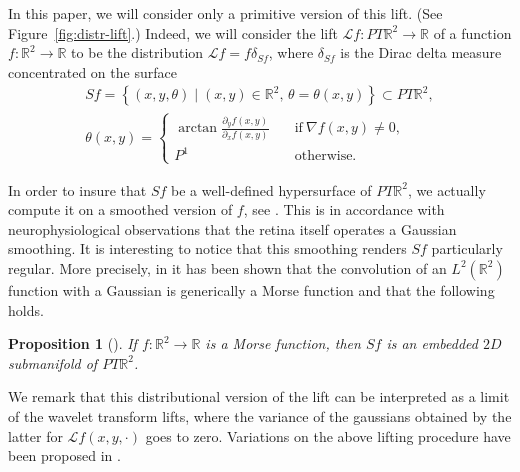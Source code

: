 \documentclass[proc]{edpsmath}
\newtheorem{proposition}[theorem]{Proposition}
\begin{document}
In this paper, we will consider only a primitive version of this lift. (See Figure~\ref{fig:distr-lift}.) Indeed, we will consider the lift $\mathcal Lf:PT\mathbb R^2\to \mathbb R$ of a function $f:\mathbb R^2\to\mathbb R$ to be the distribution $\mathcal L f = f \delta_{Sf}$, where $\delta_{Sf}$ is the Dirac delta measure concentrated on the surface
\begin{equation}
\begin{aligned}
  Sf = \left\{ \left(x,y,\theta\right)\mid (x,y)\in \mathbb R^2,\, \theta = \theta(x,y) \right\}\subset PT\mathbb R^2 ,
  \\
  \theta(x,y) = \begin{cases}
    \arctan \frac{\partial_y f(x,y)}{\partial_x f(x,y)}  &\quad \text{if} \  \nabla f(x,y)\neq 0,\\
    P^1 & \quad \text{otherwise.}
  \end{cases}
\end{aligned}
\end{equation}





In order to insure that $Sf$ be a well-defined hypersurface of $PT\mathbb R^2$, we actually compute it on a smoothed version of $f$, see \cite{Boscain2012a}.  This is in accordance with neurophysiological observations that the retina itself operates a Gaussian smoothing.  It is interesting to notice that this smoothing renders $Sf$ particularly regular. More precisely, in \cite{Boscain2012a} it has been shown that the convolution of an $L^2(\mathbb R^2)$ function with a Gaussian is generically a Morse function and that the following holds.

\begin{proposition}[\cite{Boscain2012a}]
  If $f:\mathbb R^2\to \mathbb R$ is a Morse function, then $Sf$ is an embedded $2D$ submanifold of $PT\mathbb R^2$.
\end{proposition}


We remark that this distributional version of the lift can be interpreted as a limit of the wavelet transform lifts, where the variance of the gaussians obtained by the latter for $\mathcal Lf(x,y,\cdot)$ goes to zero.
Variations on the above lifting procedure have been proposed in \cite{citti-sarti,Sanguinetti,Bredies13}.
\end{document}
